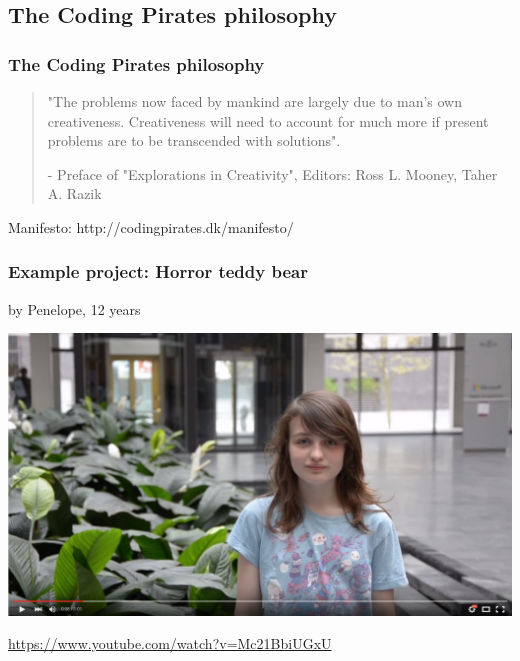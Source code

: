 \documentclass{beamer}
\begin{document}
\subsection{The Coding Pirates philosophy}
\begin{frame}
\frametitle{The Coding Pirates philosophy}

\begin{quotation}
  "The problems now faced by mankind are largely due to man's own
  creativeness. Creativeness will need to account for much more if
  present problems are to be transcended with solutions".

  - Preface of "Explorations in Creativity", Editors: Ross L. Mooney,
  Taher A. Razik
\end{quotation}


Manifesto: http://codingpirates.dk/manifesto/
\end{frame}

\begin{frame}
  \frametitle{Example project: Horror teddy bear}
  by Penelope, 12 years
  \vspace{7mm}

  \includegraphics[width=\textwidth]{imagery/penelope-raedselsbamse}

  \url{https://www.youtube.com/watch?v=Mc21BbiUGxU}
\end{frame}
\end{document}
